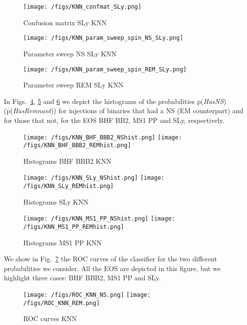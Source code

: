 \begin{figure}
\centering
\texttt{[image: /figs/KNN\_confmat\_SLy.png]}
\caption{\label{fig:KNN_confmat_SLY} Confusion matrix SLy KNN}
\end{figure}

\begin{figure}
\centering
\texttt{[image: /figs/KNN\_param\_sweep\_spin\_NS\_SLy.png]}
\caption{\label{fig:KNN_paramsweep_NS_SLY} Parameter sweep NS SLy KNN}
\end{figure}

\begin{figure}
\centering
\texttt{[image: /figs/KNN\_param\_sweep\_spin\_REM\_SLy.png]}
\caption{\label{fig:KNN_paramsweep_REM_SLY} Parameter sweep REM SLy KNN}
\end{figure}

In Figs.~\ref{fig:KNN_hist_BHFBBB2}, \ref{fig:KNN_hist_SLY} and \ref{fig:KNN_hist_MS1PP}  we depict the histograms of the probabilities p(\textit{HasNS}) (p(\textit{HasRemnant})) for injections of binaries that had a NS (EM counterpart) and for those that not, for the EOS BHF BB2, MS1 PP and SLy, respectively.

\begin{figure}
\centering
\texttt{[image: /figs/KNN\_BHF\_BBB2\_NShist.png]}
\texttt{[image: /figs/KNN\_BHF\_BBB2\_REMhist.png]}
\caption{\label{fig:KNN_hist_BHFBBB2} Histograms BHF BBB2 KNN}
\end{figure}

\begin{figure}
\centering
\texttt{[image: /figs/KNN\_SLy\_NShist.png]}
\texttt{[image: /figs/KNN\_SLy\_REMhist.png]}
\caption{\label{fig:KNN_hist_SLY} Histograms SLy KNN}
\end{figure}

\begin{figure}
\centering
\texttt{[image: /figs/KNN\_MS1\_PP\_NShist.png]}
\texttt{[image: /figs/KNN\_MS1\_PP\_REMhist.png]}
\caption{\label{fig:KNN_hist_MS1PP} Histograms MS1 PP KNN}
\end{figure}

We show in Fig.~\ref{fig:KNN_roc} the ROC curves of the classifier for the two different probabilities we consider. All the EOS are depicted in this figure, but we highlight three cases: BHF BBB2, MS1 PP and SLy.

\begin{figure}
\centering
\texttt{[image: /figs/ROC\_KNN\_NS.png]}
\texttt{[image: /figs/ROC\_KNN\_REM.png]}
\caption{\label{fig:KNN_roc} ROC curves KNN}
\end{figure}




